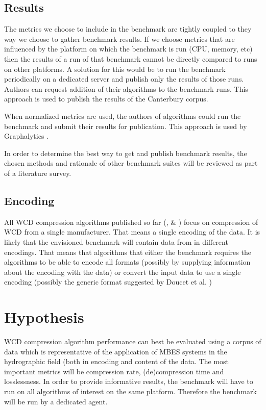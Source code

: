 \subsection{Results}
The metrics we choose to include in the benchmark are tightly coupled to they way we choose to gather benchmark results. If we choose metrics that are influenced by the platform on which the benchmark is run (CPU, memory, etc) then the results of a run of that benchmark cannot be directly compared to runs on other platforms. A solution for this would be to run the benchmark periodically on a dedicated server and publish only the results of those runs. Authors can request addition of their algorithms to the benchmark runs. This approach is used to publish the results of the Canterbury corpus\cite{powell2001evaluating}.

When normalized metrics are used, the authors of algorithms could run the benchmark and submit their results for publication. This approach is used by Graphalytics \cite{capotua2015graphalytics}. 

In order to determine the best way to get and publish benchmark results, the chosen methods and rationale of other benchmark suites will be reviewed as part of a literature survey. 

\subsection{Encoding}
All WCD compression algorithms published so far (\cite{beaudoin2010application}, \cite{moszynski2013novel} \& \cite{amblasreal}) focus on compression of WCD from a single manufacturer. That means a single encoding of the data. It is likely that the envisioned benchmark will contain data from in different encodings. That means that algorithms that either the benchmark requires the algorithms to be able to encode all formats (possibly by supplying information about the encoding with the data) or convert the input data to use a single encoding (possibly the generic format suggested by Doucet et al. \cite{doucet2009advanced})

\section{Hypothesis}
WCD compression algorithm performance can best be evaluated using a corpus of data which is representative of the application of MBES systems in the hydrographic field (both in encoding and content of the data. The most important metrics will be compression rate, (de)compression time and losslessness. 
In order to provide informative results, the benchmark will have to run on all algorithms of interest on the same platform. Therefore the benchmark will be run by a dedicated agent.

